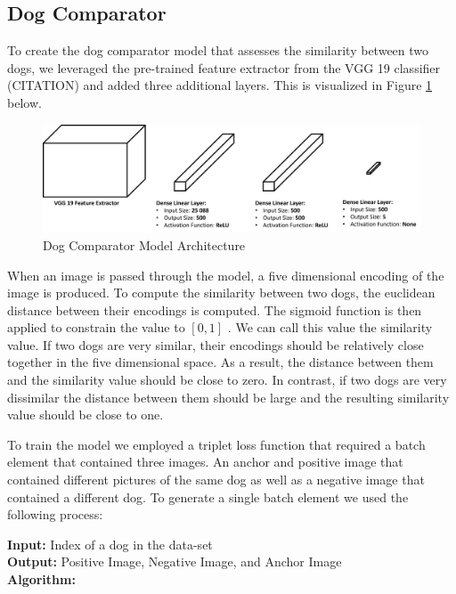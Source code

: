 \documentclass{article}
\begin{document}
\subsection{Dog Comparator}
To create the dog comparator model that assesses the similarity between two dogs, we leveraged the pre-trained feature extractor from the VGG 19 classifier (CITATION) and added three additional layers.  This is visualized in Figure \ref{fig:x comparator} below.

\begin{figure}[h]
\centering
	\includegraphics[scale=0.4]{final-report-images/dog_comparator.png}
\caption{Dog Comparator Model Architecture}
\label{fig:x comparator}
\end{figure}

\noindent When an image is passed through the model, a five dimensional encoding of the image is produced.  To compute the similarity between two dogs, the euclidean distance between their encodings is computed.  The sigmoid function is then applied to constrain the value to $[0,1]$ .  We can call this value the similarity value.  If two dogs are very similar, their encodings should be relatively close together in the five dimensional space.  As a result, the distance between them and the similarity value should be close to zero.  In contrast, if two dogs are very dissimilar the distance between them should be large and the resulting similarity value should be close to one.  

To train the model we employed a triplet loss function that required a batch element that contained three images.  An anchor and positive image that contained different pictures of the same dog as well as a negative image that contained a different dog.  To generate a single batch element we used the following process: \\

    \begin{minipage}{1\textwidth}%
      \noindent \textbf{Input:} Index of a dog in the data-set \\
      
      \noindent \textbf{Output:} Positive Image, Negative Image, and Anchor Image \\
      
      \noindent \textbf{Algorithm:} \\
    \end{minipage}%
    
\end{document}
